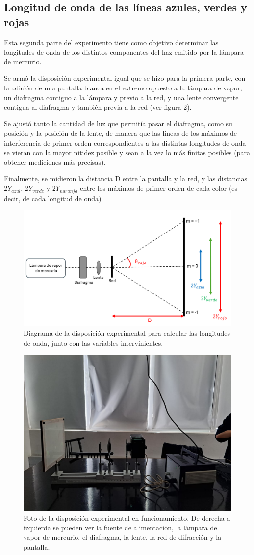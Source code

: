 \documentclass[12pt, a4paper]{article}
\begin{document}
\subsection{Longitud de onda de las líneas azules, verdes y rojas}
Esta segunda parte del experimento tiene como objetivo determinar las longitudes de onda de los distintos componentes del haz emitido por la lámpara de mercurio. \par Se armó la disposición experimental igual que se hizo para la primera parte, con la adición de una pantalla blanca en el extremo opuesto a la lámpara de vapor, un diafragma contiguo a la lámpara y previo a la red, y una lente convergente contigua al diafragma y también previa a la red (ver figura 2).\par Se ajustó tanto la cantidad de luz que permitía pasar el diafragma, como su posición y la posición de la lente, de manera que las líneas de los máximos de interferencia de primer orden correspondientes a las distintas longitudes de onda se vieran con la mayor nitidez posible y sean a la vez lo más finitas posibles (para obtener mediciones más precisas). \par Finalmente, se midieron la distancia D entre la pantalla y la red, y las distancias $2Y_{azul}$, $2Y_{verde}$ y $2Y_{naranja}$ entre los máximos de primer orden de cada color (es decir, de cada longitud de onda).

\begin{figure}[!h] 
        \centering \includegraphics[width=0.5\columnwidth]{diagramaExperimental2.png}
        \caption{\label{fig2}Diagrama de la disposición experimental para calcular las longitudes de onda, junto con las variables intervinientes.
        }
\end{figure}

\begin{figure}[!h] 
        \centering \includegraphics[width=0.5\columnwidth]{dispositivo3.jpg}
        \caption{\label{fig3}Foto de la disposición experimental en funcionamiento. De derecha a izquierda se pueden ver la fuente de alimentación, la lámpara de vapor de mercurio, el diafragma, la lente, la red de difracción y la pantalla.
        }
\end{figure}
\end{document}
